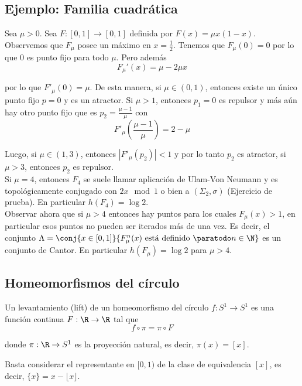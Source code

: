 \documentclass[	docname= Sistemas\ Din\'amicos,
				finished=1,
				semester=1,
				year=2017,
				professor=Godofredo\ Iommi,
				sigla=MAT2565]{apunte}
\begin{document}
\subsection{Ejemplo: Familia cuadrática}
Sea $\mu > 0$. Sea $F: [0,1] \to [0,1]$ definida por $F(x) = \mu x(1-x)$. Observemos que $F_{\mu}$ posee un máximo en $x= \frac{1}{2}$. Tenemos que $F_{\mu}(0) = 0$ por lo que 0 es punto fijo para todo $\mu$. Pero además
	$$F_{\mu}'(x) = \mu - 2\mu x$$
 
por lo que $F'_{\mu}(0) = \mu$. De esta manera, si $\mu \in (0,1)$, entonces existe un único punto fijo $p = 0$ y es un atractor. Si $\mu > 1$, entonces $p_{1} =0$ es repulsor y más aún hay otro punto fijo que es $p_{2} = \frac{\mu - 1}{\mu}$ con
	$$F'_{\mu}\left(\frac{\mu-1}{\mu}\right) = 2- \mu $$

Luego, si $\mu \in (1,3)$, entonces $|F'_{\mu}(p_{2})| < 1$ y por lo tanto $p_{2}$ es atractor, si $\mu > 3$, entonces $p_{2}$ es repulsor.	\\

Si $\mu = 4$, entonces $F_{4}$ se suele llamar aplicación de Ulam-Von Neumann y es topológicamente conjugado con $2x \mod 1$ o bien a $(\Sigma_{2}, \sigma)$ (Ejercicio de prueba). En particular $h(F_{4}) = \log 2$.	\\

Observar ahora que si $\mu > 4$ entonces hay puntos para los cuales $F_{\mu}(x) > 1$, en particular esos puntos no pueden ser iterados más de una vez. Es decir, el conjunto $\Lambda = \conj{x \in [0,1]}{F_{\mu}^{n}(x) \text{ está definido } \paratodo n \in \N}$ es un conjunto de Cantor. En particular $h(F_{\mu}) = \log 2$ para $\mu > 4$.


\subsection{Homeomorfismos del círculo}

\begin{defn} Un levantamiento (lift) de un homeomorfismo del círculo $f: S^{1} \to S^{1}$ es una función continua $F: \R \to \R$ tal que
	$$f \circ \pi = \pi \circ F$$

donde $\pi : \R \to S^{1}$ es la proyección natural, es decir, $\pi(x) = [x]$. 
\end{defn}

\begin{obsd} Basta considerar el representante en $[0,1)$ de la clase de equivalencia $[x]$, es decir, $\{x\} = x - \lfloor x \rfloor$.
\end{obsd}
\end{document}

